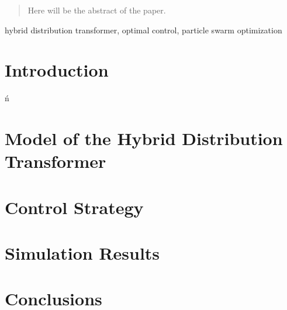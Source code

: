 





\maketitle

\begin{abstract}
Here will be the abstract of the paper.
\end{abstract}

\begin{IEEEkeywords}
    hybrid distribution transformer, optimal control, particle swarm optimization
\end{IEEEkeywords}

\section{Introduction}
ń


\section{Model of the Hybrid Distribution Transformer}



\section{Control Strategy}



\section{Simulation Results}



\section{Conclusions}








